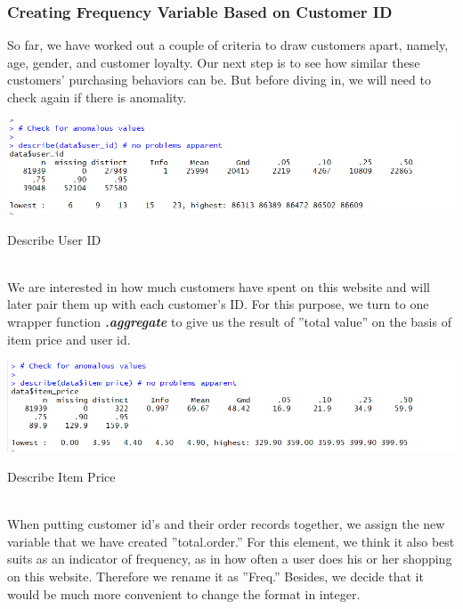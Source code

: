 \documentclass[a4paper,12pt,fleqn]{article}
\begin{document}
\subsubsection{Creating Frequency Variable Based on Customer ID}
So far, we have worked out a couple of criteria to draw customers apart, namely, age, gender, and customer loyalty. Our next step is to see how similar these customers' purchasing behaviors can be. But before diving in, we will need to check again if there is anomality.\\
\begin{table}[h]
	\centering
	\includegraphics[width=0.95\linewidth]{"3.describe user id"}
	\caption{Describe User ID}
	\label{fig:3}
\end{table}\\

We are interested in how much customers have spent on this website and will later pair them up with each customer's ID. For this purpose, we turn to one wrapper function \textbf{\textit{.aggregate}} to give us the result of ''total value'' on the basis of item price and user id.\\
\begin{table}[h]
	\centering
	\includegraphics[width=0.95\linewidth]{4.describe_item_price}
	\caption{Describe Item Price}
	\label{fig:4}
\end{table}
\\
When putting customer id's and their order records together, we assign the new variable that we have created ''total.order.'' For this element, we think it also best suits as an indicator of frequency, as in how often a user does his or her shopping on this website. Therefore we rename it as ''Freq.'' Besides, we decide that it would be much more convenient to change the format in integer. \\
\end{document}

